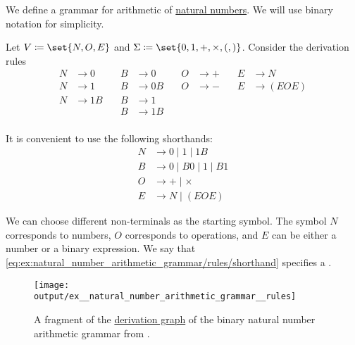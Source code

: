 \begin{example}\label{ex:natural_number_arithmetic_grammar/rules}
  We define a grammar for arithmetic of \hyperref[def:natural_numbers]{natural numbers}. We will use binary notation for simplicity.

  Let \( V \coloneqq \set{ N, O, E } \) and \( \Sigma \coloneqq \set{ 0, 1, +, \times, (, ) } \). Consider the derivation rules
  \begin{equation}\label{eq:ex:natural_number_arithmetic_grammar/rules/simple}
    \begin{aligned}
      N &\to 0   & \quad B &\to 0   & \quad O &\to +      & \quad E &\to N \\
      N &\to 1   & \quad B &\to 0 B & \quad O &\to -      & \quad E &\to (E O E) \\
      N &\to 1 B & \quad B &\to 1   & \quad   &           &         & \\
        &        & \quad B &\to 1 B & \quad   &           &         & \\
    \end{aligned}
  \end{equation}

  It is convenient to use the following shorthands:
  \begin{equation}\label{eq:ex:natural_number_arithmetic_grammar/rules/shorthand}
    \begin{aligned}
      N &\to 0 \mid 1 \mid 1 B \\
      B &\to 0 \mid B 0 \mid 1 \mid B 1 \\
      O &\to + \mid \times \\
      E &\to N \mid (E O E)
    \end{aligned}
  \end{equation}

  We can choose different non-terminals as the starting symbol. The symbol \( N \) corresponds to numbers, \( O \) corresponds to operations, and \( E \) can be either a number or a binary expression. We say that \eqref{eq:ex:natural_number_arithmetic_grammar/rules/shorthand} specifies a .

  \begin{figure}[!ht]
    \centering
    \texttt{[image: output/ex\_\_natural\_number\_arithmetic\_grammar\_\_rules]}
    \caption{A fragment of the \hyperref[def:formal_grammar/graph]{derivation graph} of the binary natural number arithmetic grammar from .}
    \label{fig:ex:natural_number_arithmetic_grammar/rules}
  \end{figure}
\end{example}

